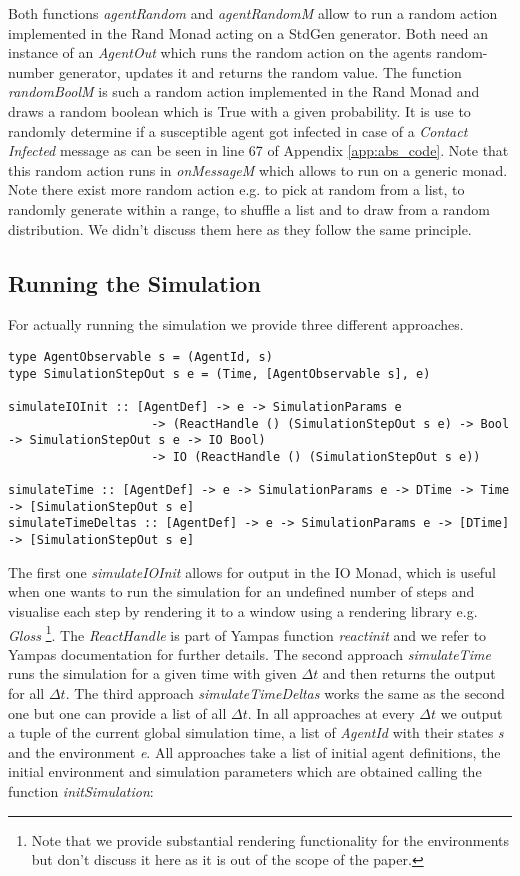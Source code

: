 Both functions \textit{agentRandom} and \textit{agentRandomM} allow to run a random action implemented in the Rand Monad acting on a StdGen generator. Both need an instance of an \textit{AgentOut} which runs the random action on the agents random-number generator, updates it and returns the random value.
The function \textit{randomBoolM} is such a random action implemented in the Rand Monad and draws a random boolean which is True with a given probability. It is use to randomly determine if a susceptible agent got infected in case of a \textit{Contact Infected} message as can be seen in line 67 of Appendix \ref{app:abs_code}. Note that this random action runs in \textit{onMessageM} which allows to run on a generic monad. Note there exist more random action e.g. to pick at random from a list, to randomly generate within a range, to shuffle a list and to draw from a random distribution. We didn't discuss them here as they follow the same principle.

\subsection{Running the Simulation}
For actually running the simulation we provide three different approaches. 

\begin{verbatim}
type AgentObservable s = (AgentId, s)
type SimulationStepOut s e = (Time, [AgentObservable s], e)

simulateIOInit :: [AgentDef] -> e -> SimulationParams e
                    -> (ReactHandle () (SimulationStepOut s e) -> Bool -> SimulationStepOut s e -> IO Bool)
                    -> IO (ReactHandle () (SimulationStepOut s e))
                    
simulateTime :: [AgentDef] -> e -> SimulationParams e -> DTime -> Time -> [SimulationStepOut s e]
simulateTimeDeltas :: [AgentDef] -> e -> SimulationParams e -> [DTime] -> [SimulationStepOut s e]
\end{verbatim}

The first one \textit{simulateIOInit} allows for output in the IO Monad, which is useful when one wants to run the simulation for an undefined number of steps and visualise each step by rendering it to a window using a rendering library e.g. \textit{Gloss} \footnote{Note that we provide substantial rendering functionality for the environments but don't discuss it here as it is out of the scope of the paper.}. The \textit{ReactHandle} is part of Yampas function \textit{reactinit} and we refer to Yampas documentation for further details. The second approach \textit{simulateTime} runs the simulation for a given time with given $\Delta t$ and then returns the output for all $\Delta t$. The third approach \textit{simulateTimeDeltas} works the same as the second one but one can provide a list of all $\Delta t$. In all approaches at every $\Delta t$ we output a tuple of the current global simulation time, a list of \textit{AgentId} with their states \textit{s} and the environment \textit{e}. All approaches take a list of initial agent definitions, the initial environment and simulation parameters which are obtained calling the function \textit{initSimulation}:

